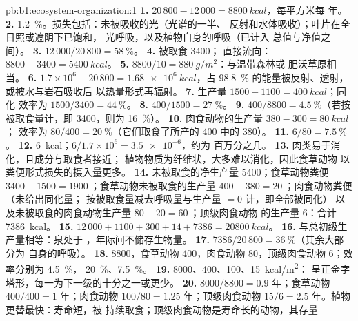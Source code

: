 \begin{solution}{pb:b1:ecosystem-organization:1}
\textbf{1.} $20\,800 - 12\,000 = \qty{8800}{kcal}$，每平方米每
年。
\textbf{2.} \qty{1.2}{\%}。损失包括：未被吸收的光（光谱的一半、
反射和水体吸收）；叶片在全日照或遮阴下已饱和，
光呼吸，以及植物自身的呼吸（已计入
总值与净值之间）。
\textbf{3.} $12\,000/20\,800 = \qty{58}{\%}$。
\textbf{4.} 被取食 \qty{3400}{}；
直接流向：$8800 - 3400 = \qty{5400}{kcal}$。
\textbf{5.} $8800/10 = \qty{880}{g/m^2}$：与温带森林或
肥沃草原相当。
\textbf{6.} $1.7\times 10^6 - 20\,800 = \qty{1.68e6}{kcal}$，占 \qty{98.8}{\%}
的能量被反射、透射，或被水与岩石吸收后
以热量形式再辐射。
\textbf{7.} 生产量 $1500 - 1100 = \qty{400}{kcal}$；同化
效率为 $1500/3400 = \qty{44}{\%}$。
\textbf{8.} $400/1500 = \qty{27}{\%}$。
\textbf{9.} $400/8800 = \qty{4.5}{\%}$（若按
被取食量计，即 \qty{3400}{}，则为 \qty{16}{\%}）。
\textbf{10.} 肉食动物的生产量 $380 - 300 = \qty{80}{kcal}$；
效率为 $80/400 = \qty{20}{\%}$（它们取食了所产的
\qty{400}{} 中的 \qty{380}{}）。
\textbf{11.} $6/80 = \qty{7.5}{\%}$。
\textbf{12.} \qty{6}{kcal}；$6/1.7\times 10^6 = \num{3.5e-6}$，约为
百万分之几。
\textbf{13.} 肉类易于消化，且成分与取食者接近；
植物物质为纤维状，大多难以消化，因此食草动物
以粪便形式损失的摄入量更多。
\textbf{14.} 未被取食的净生产量 \qty{5400}{}；食草动物粪便
$3400 - 1500 = \qty{1900}{}$；食草动物未被取食的生产量
$400 - 380 = \qty{20}{}$；肉食动物粪便（未给出同化量；
按被取食量减去呼吸量与生产量 $= 0$ 计，即全部被同化）
以及未被取食的肉食动物生产量 $80 - 20 = \qty{60}{}$；顶级肉食动物
的生产量 \qty{6}{}：合计 \qty{7386}{kcal}。
\textbf{15.} $12\,000 + 1100 + 300 + 14 + 7386 = \qty{20800}{kcal}$。
\textbf{16.} 与总初级生产量相等：泉处于
，年际间不储存生物量。
\textbf{17.} $7386/20\,800 = \qty{36}{\%}$（其余大部分为
自身的呼吸）。
\textbf{18.}  \qty{8800}{}，食草动物 \qty{400}{}，肉食动物
\qty{80}{}，顶级肉食动物 \qty{6}{}；效率分别为 \qty{4.5}{\%}，
\qty{20}{\%}、\qty{7.5}{\%}。
\textbf{19.} \qty{8000}{}、\qty{400}{}、\qty{100}{}、\qty{15}{kcal/m^2}：
呈正金字塔形，每一为下一级的十分之一或更少。
\textbf{20.}  $8000/8800 = 0.9$ 年；食草动物 $400/400 =
1$ 年；肉食动物 $100/80 = 1.25$ 年；顶级肉食动物 $15/6 =
2.5$ 年。植物更替最快：寿命短，被
持续取食；顶级肉食动物是寿命长的动物，其存量

\end{solution}
